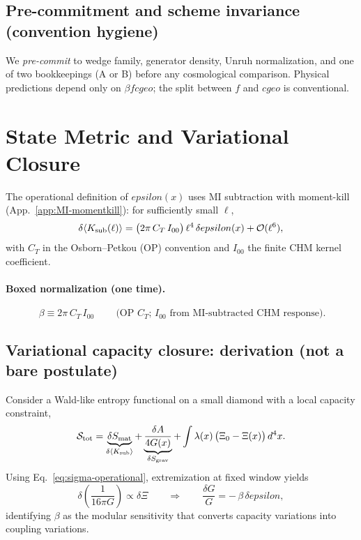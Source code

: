 \documentclass[aps,prd,onecolumn,superscriptaddress,nofootinbib]{revtex4-2}
\def\cgeo{cgeo}%
\def\eps{epsilon}%
\def\boxed#1{#1}%
\newcommand{\cgeo}{c_{\rm geo}}
\newcommand{\eps}{\varepsilon}
\begin{document}
\subsection{Pre-commitment and scheme invariance (convention hygiene)}
\label{sec:precommit}
We \emph{pre-commit} to wedge family, generator density, Unruh normalization, and one of two bookkeepings (A or B) before any cosmological comparison. Physical predictions depend only on $\beta f \cgeo$; the split between $f$ and $\cgeo$ is conventional.

\section{State Metric and Variational Closure}
\label{sec:state-metric}
The operational definition of $\eps(x)$ uses MI subtraction with moment-kill (App.~\ref{app:MI-momentkill}): for sufficiently small $\ell$,
\begin{equation}
\label{eq:sigma-operational}
\delta\langle K_{\rm sub}(\ell)\rangle = \big(2\pi\, C_T\, I_{00}\big)\,\ell^4\,\delta\eps(x) + \mathcal O(\ell^6),
\end{equation}
with $C_T$ in the Osborn--Petkou (OP) convention and $I_{00}$ the finite CHM kernel coefficient.

\paragraph*{Boxed normalization (one time).}
\begin{equation}
\boxed{\ \beta \equiv 2\pi\, C_T\, I_{00}\ }\qquad
\text{(OP $C_T$; $I_{00}$ from MI-subtracted CHM response).}
\label{eq:beta-box}
\end{equation}

\subsection{Variational capacity closure: derivation (not a bare postulate)}
\label{sec:variational-closure}
Consider a Wald-like entropy functional on a small diamond with a local capacity constraint,
\begin{equation}
\mathcal{S}_{\rm tot} = \underbrace{\delta S_{\rm mat}}_{\delta\langle K_{\rm sub}\rangle} + \underbrace{\frac{\delta A}{4G(x)}}_{\delta S_{\rm grav}} + \int \lambda(x)\,\big(\Xi_0-\Xi(x)\big)\,d^4x.
\end{equation}
Using Eq.~\eqref{eq:sigma-operational}, extremization at fixed window yields
\begin{equation}
\delta\!\left(\frac{1}{16\pi G}\right) \propto \delta \Xi
\qquad\Rightarrow\qquad
\frac{\delta G}{G} = -\,\beta\,\delta \eps,
\end{equation}
identifying $\beta$ as the modular sensitivity that converts capacity variations into coupling variations.
\end{document}

